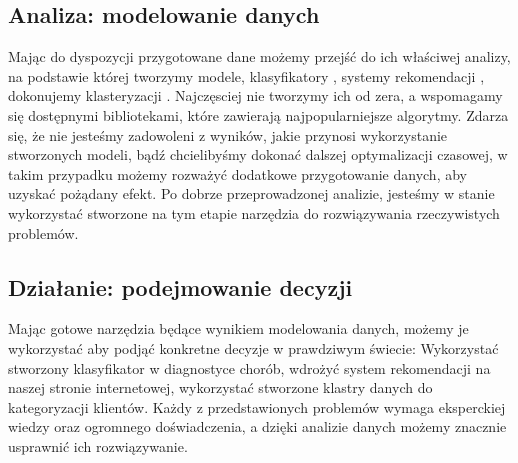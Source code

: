 \documentclass[oneside]{book}
\begin{document}
\subsection*{Analiza: modelowanie danych}
Mając do dyspozycji przygotowane dane możemy przejść do ich właściwej analizy, 
na podstawie której tworzymy modele, 
klasyfikatory \cite{classifiers}, systemy rekomendacji 
\cite{recomendation_systems}, dokonujemy klasteryzacji \cite{clustering}. 
Najczęsciej nie tworzymy ich od zera, 
a wspomagamy się dostępnymi bibliotekami, 
które zawierają 
najpopularniejsze algorytmy. Zdarza się, 
że nie jesteśmy zadowoleni z wyników, jakie przynosi 
wykorzystanie stworzonych modeli, 
bądź chcielibyśmy dokonać dalszej optymalizacji czasowej, 
w takim przypadku możemy rozważyć 
dodatkowe przygotowanie danych, aby uzyskać pożądany efekt.
Po dobrze przeprowadzonej analizie, jesteśmy w stanie 
wykorzystać stworzone na tym etapie 
narzędzia do rozwiązywania rzeczywistych problemów.

\subsection*{Działanie: podejmowanie decyzji}
Mając gotowe narzędzia będące wynikiem 
modelowania danych, możemy je wykorzystać aby podjąć 
konkretne decyzje w prawdziwym świecie: Wykorzystać stworzony 
klasyfikator w diagnostyce chorób, wdrożyć system rekomendacji 
na naszej stronie internetowej, wykorzystać stworzone klastry 
danych do kategoryzacji klientów. 
Każdy z przedstawionych problemów wymaga 
eksperckiej wiedzy oraz ogromnego doświadczenia, 
a dzięki analizie danych możemy 
znacznie usprawnić ich rozwiązywanie.
\end{document}
